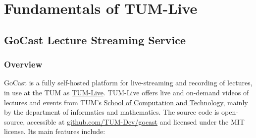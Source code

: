 
\chapter{Fundamentals of TUM-Live}\label{chapter:fundamentals}

\section{GoCast Lecture Streaming Service}

\subsection{Overview}

GoCast is a fully self-hosted platform for live-streaming and recording of lectures, in use at the \ac{TUM} as \href{https://tum.live}{TUM-Live}.
TUM-Live offers live and on-demand videos of lectures and events from \ac{TUM}'s \href{https://www.cit.tum.de/}{School of Computation and Technology}, mainly by the department of informatics and mathematics. The source code is open-source, accessible at \href{https://github.com/TUM-Dev/gocast}{github.com/TUM-Dev/gocast} and licensed under the MIT license. Its main features include:

